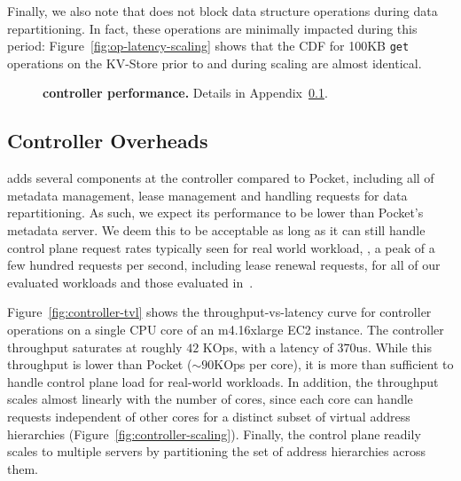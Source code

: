Finally, we also note that \jiffy does not block data structure operations during data repartitioning. In fact, these operations are minimally impacted during this period: Figure~\ref{fig:op-latency-scaling} shows that the CDF for 100KB \texttt{get} operations on the KV-Store prior to and during scaling are almost identical.

\begin{figure}[h]
  \centering
  \vspace{-1em}
  \caption{{\textbf{\jiffy controller performance.} Details in Appendix~\ref{ssec:controller-scale}.}}
  \label{fig:controller-perf}
  \vspace{-1.5em}
\end{figure}

\subsection{Controller Overheads}
\label{ssec:controller-scale}

\jiffy adds several components at the controller compared to Pocket, including all of metadata management, lease management and handling requests for data repartitioning. As such, we expect its performance to be lower than Pocket's metadata server. We deem this to be acceptable as long as it can still handle control plane request rates typically seen for real world workload, \eg, a peak of a few hundred requests per second, including lease renewal requests, for all of our evaluated workloads and those evaluated in~\cite{pocket}.

Figure~\ref{fig:controller-tvl} shows the throughput-vs-latency curve for \jiffy controller operations on a single CPU core of an m4.16xlarge EC2 instance. The controller throughput saturates at roughly $42$ KOps, with a latency of $370$us. While this throughput is lower than Pocket ($\sim 90$KOps per core), it is more than sufficient to handle control plane load for real-world workloads. In addition, the throughput scales almost linearly with the number of cores, since each core can handle requests independent of other cores for a distinct subset of virtual address hierarchies (Figure~\ref{fig:controller-scaling}). Finally, the control plane readily scales to multiple servers by partitioning the set of address hierarchies across them.

